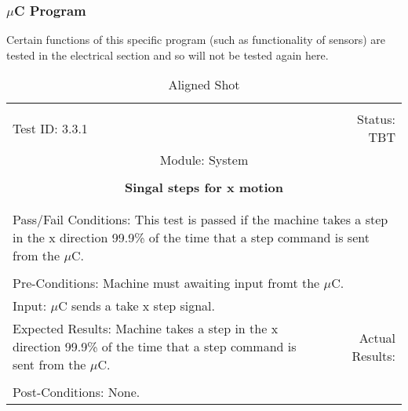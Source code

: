 \documentclass[titlepage]{article}
\begin{document}
\subsubsection{$\mu$C Program}
Certain functions of this specific program (such as functionality of sensors) are tested in the electrical section and so will not be tested again here.
\begin{center}%
\begin{table}
\begin{tabular}{|l r|}\hline&\\[-2mm]
	Test ID: 3.3.1	&Status: TBT\\[-3mm]
	\multicolumn{2}{|c|}{Module: System}\\&\\
	\multicolumn{2}{|c|}{\textbf{\large{Singal steps for x motion}}}\\&\\\hline&\\[-3mm]
	\multicolumn{2}{|p{\textwidth}|}{Pass/Fail Conditions: This test is passed if the machine takes a step in the x direction 99.9\% of the time that a step command is sent from the $\mu$C.}\\[1mm]\hline&\\[-3mm]
	\multicolumn{2}{|p{\textwidth}|}{Pre-Conditions: Machine must awaiting input fromt the $\mu$C.}\\[4mm]
	\multicolumn{2}{|p{\textwidth}|}{Input: $\mu$C sends a take x step signal.}\\[2mm]\hline
	\multicolumn{1}{|p{0.49\textwidth}}{Expected Results: Machine takes a step in the x direction 99.9\% of the time that a step command is sent from the $\mu$C.}	&\multicolumn{1}{|p{0.45\textwidth}|}{Actual Results: }\\\hline&\\[-3mm]
	\multicolumn{2}{|p{\textwidth}|}{Post-Conditions: None.}\\\hline
\end{tabular}
\caption{Aligned Shot}
\end{table}
\end{center}
\end{document}

